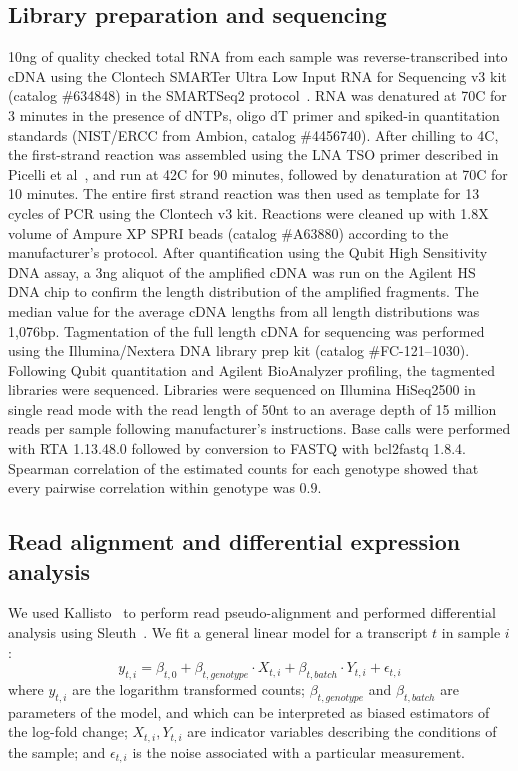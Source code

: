 \documentclass[9pt,twocolumn,twoside,lineno]{pnas-new}
\begin{document}
{\subsection*{Library preparation and sequencing}
10ng of quality checked total RNA from each sample was reverse-transcribed into
cDNA using the Clontech SMARTer Ultra Low Input RNA for Sequencing v3 kit
(catalog \#634848) in the SMARTSeq2 protocol~\cite{Picelli2014}.  RNA was
denatured at 70\degree{}C for 3 minutes in the presence of dNTPs, oligo dT
primer and spiked-in quantitation standards (NIST/ERCC from Ambion, catalog
\#4456740).  After chilling to 4\degree{}C, the first-strand reaction was
assembled using the LNA TSO primer described in Picelli et
al~\cite{Picelli2014}, and run at 42\degree{}C for 90 minutes, followed by
denaturation at 70\degree{}C for 10 minutes.  The entire first strand reaction
was then used as template for 13 cycles of PCR using the Clontech v3 kit.
Reactions were cleaned up with 1.8X volume of Ampure XP SPRI beads (catalog
\#A63880) according to the manufacturer’s protocol.  After quantification using
the Qubit High Sensitivity DNA assay, a 3ng aliquot of the amplified cDNA was
run on the Agilent HS DNA chip to confirm the length distribution of the
amplified fragments.  The median value for the average cDNA lengths from all
length distributions was 1,076bp.  Tagmentation of the full length cDNA for
sequencing was performed using the Illumina/Nextera DNA library prep kit
(catalog \#FC-121--1030). Following Qubit quantitation and Agilent BioAnalyzer
profiling, the tagmented libraries were sequenced. Libraries were sequenced on
Illumina HiSeq2500 in single read mode with the read length of 50nt to an
average depth of 15 million reads per sample following manufacturer's
instructions. Base calls were performed with RTA 1.13.48.0 followed by
conversion to FASTQ with bcl2fastq 1.8.4. Spearman correlation of the estimated
counts for each genotype showed that every pairwise correlation within genotype
was $0.9$.

\subsection*{Read alignment and differential expression analysis} We used
Kallisto~\cite{Bray2016} to perform read pseudo-alignment and performed
differential analysis using Sleuth~\cite{Pimentel2016}. We fit a general linear
model for a transcript $t$ in sample $i$:
\begin{equation}
  y_{t,i} = \beta_{t, 0} + \beta_{t, genotype}\cdot{}X_{t, i} +
  \beta_{t, batch}\cdot{}Y_{t, i} + \epsilon_{t, i}
\end{equation}
where $y_{t, i}$ are the logarithm transformed counts; $\beta_{t, genotype}$ and
$\beta_{t, batch}$ are parameters of the model, and which can be interpreted as
biased estimators of the log-fold change; $X_{t, i}, Y_{t, i}$ are indicator
variables describing the conditions of the sample; and $\epsilon_{t, i}$ is the
noise associated with a particular measurement.

}
\end{document}
